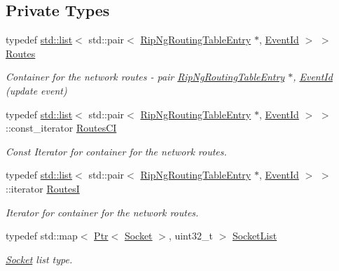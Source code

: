 \subsection*{Private Types}
\begin{DoxyCompactItemize}
\item 
typedef \hyperlink{openflow-interface_8h_afd9bcfa176617760671b67580f536fa7}{std\+::list}$<$ std\+::pair$<$ \hyperlink{classns3_1_1RipNgRoutingTableEntry}{Rip\+Ng\+Routing\+Table\+Entry} $\ast$, \hyperlink{classns3_1_1EventId}{Event\+Id} $>$ $>$ \hyperlink{classns3_1_1RipNg_a1d5addc59db17a00021a99e7d6ff9ccd}{Routes}
\begin{DoxyCompactList}\small\item\em Container for the network routes -\/ pair \hyperlink{classns3_1_1RipNgRoutingTableEntry}{Rip\+Ng\+Routing\+Table\+Entry} $\ast$, \hyperlink{classns3_1_1EventId}{Event\+Id} (update event) \end{DoxyCompactList}\item 
typedef \hyperlink{openflow-interface_8h_afd9bcfa176617760671b67580f536fa7}{std\+::list}$<$ std\+::pair$<$ \hyperlink{classns3_1_1RipNgRoutingTableEntry}{Rip\+Ng\+Routing\+Table\+Entry} $\ast$, \hyperlink{classns3_1_1EventId}{Event\+Id} $>$ $>$\+::const\+\_\+iterator \hyperlink{classns3_1_1RipNg_a139e1c11e66791c62fa5ccf632723f95}{Routes\+CI}
\begin{DoxyCompactList}\small\item\em Const Iterator for container for the network routes. \end{DoxyCompactList}\item 
typedef \hyperlink{openflow-interface_8h_afd9bcfa176617760671b67580f536fa7}{std\+::list}$<$ std\+::pair$<$ \hyperlink{classns3_1_1RipNgRoutingTableEntry}{Rip\+Ng\+Routing\+Table\+Entry} $\ast$, \hyperlink{classns3_1_1EventId}{Event\+Id} $>$ $>$\+::iterator \hyperlink{classns3_1_1RipNg_aa8bc6103d67089e1e3cd507936f94887}{RoutesI}
\begin{DoxyCompactList}\small\item\em Iterator for container for the network routes. \end{DoxyCompactList}\item 
typedef std\+::map$<$ \hyperlink{classns3_1_1Ptr}{Ptr}$<$ \hyperlink{classns3_1_1Socket}{Socket} $>$, uint32\+\_\+t $>$ \hyperlink{classns3_1_1RipNg_a30c4bb1a1f2d08a0387268645d15d328}{Socket\+List}
\begin{DoxyCompactList}\small\item\em \hyperlink{classns3_1_1Socket}{Socket} list type. \end{DoxyCompactList}\item 

\end{DoxyCompactItemize}
